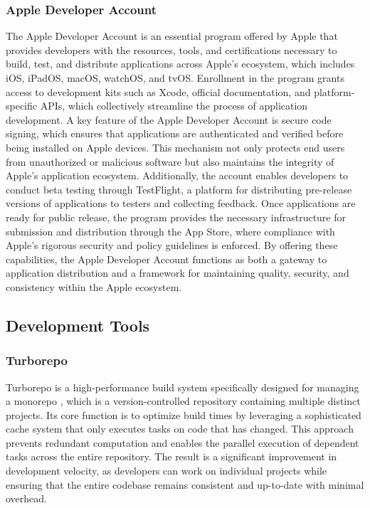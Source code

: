 \subsubsection{Apple Developer Account}
The Apple Developer Account is an essential program offered by Apple that provides developers with the resources, tools, and certifications necessary to build, test, and distribute applications across Apple’s ecosystem, which includes iOS, iPadOS, macOS, watchOS, and tvOS. Enrollment in the program grants access to development kits such as Xcode, official documentation, and platform-specific APIs, which collectively streamline the process of application development. \cite{apple2025devdocs}
A key feature of the Apple Developer Account is secure code signing, which ensures that applications are authenticated and verified before being installed on Apple devices. This mechanism not only protects end users from unauthorized or malicious software but also maintains the integrity of Apple’s application ecosystem. Additionally, the account enables developers to conduct beta testing through TestFlight, a platform for distributing pre-release versions of applications to testers and collecting feedback. Once applications are ready for public release, the program provides the necessary infrastructure for submission and distribution through the App Store, where compliance with Apple’s rigorous security and policy guidelines is enforced. By offering these capabilities, the Apple Developer Account functions as both a gateway to application distribution and a framework for maintaining quality, security, and consistency within the Apple ecosystem.

\subsection{Development Tools}
\subsubsection{Turborepo}
Turborepo is a high-performance build system specifically designed for managing a monorepo \cite{turborepo2025intro}, which is a version-controlled repository containing multiple distinct projects. Its core function is to optimize build times by leveraging a sophisticated cache system that only executes tasks on code that has changed. This approach prevents redundant computation and enables the parallel execution of dependent tasks across the entire repository. The result is a significant improvement in development velocity, as developers can work on individual projects while ensuring that the entire codebase remains consistent and up-to-date with minimal overhead.

